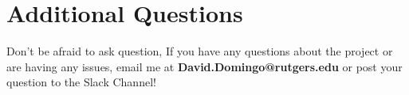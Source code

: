\documentclass{article}
\begin{document}

\section*{Additional Questions} %
Don't be afraid to ask question, If you have any questions about the project or are having any issues, email me at \textbf{David.Domingo@rutgers.edu} or post your question to the Slack Channel!

%
\end{document}

